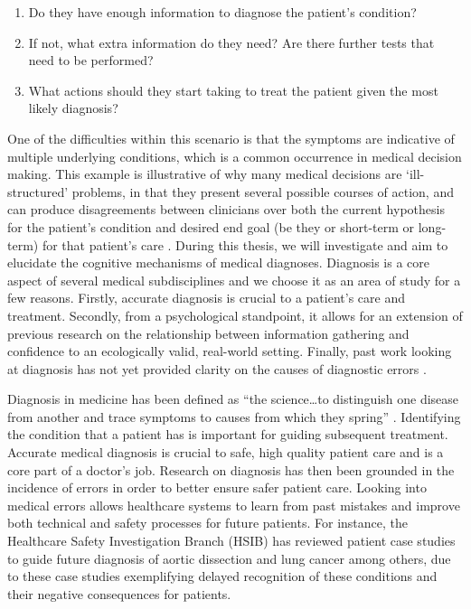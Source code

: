 \documentclass[a4paper, nobind]{templates/ociamthesis}
\providecommand{\tightlist}{%
  \setlength{\itemsep}{0pt}\setlength{\parskip}{0pt}}
\begin{document}
\begin{enumerate}
\def\labelenumi{\arabic{enumi}.}
\tightlist
\item
  Do they have enough information to diagnose the patient's condition?
\item
  If not, what extra information do they need? Are there further tests that need to be performed?
\item
  What actions should they start taking to treat the patient given the most likely diagnosis?
\end{enumerate}

One of the difficulties within this scenario is that the symptoms are indicative of multiple underlying conditions, which is a common occurrence in medical decision making. This example is illustrative of why many medical decisions are `ill-structured' problems, in that they present several possible courses of action, and can produce disagreements between clinicians over both the current hypothesis for the patient's condition and desired end goal (be they or short-term or long-term) for that patient's care \autocite{jonassen_instructional_1997}. During this thesis, we will investigate and aim to elucidate the cognitive mechanisms of medical diagnoses. Diagnosis is a core aspect of several medical subdisciplines and we choose it as an area of study for a few reasons. Firstly, accurate diagnosis is crucial to a patient's care and treatment. Secondly, from a psychological standpoint, it allows for an extension of previous research on the relationship between information gathering and confidence to an ecologically valid, real-world setting. Finally, past work looking at diagnosis has not yet provided clarity on the causes of diagnostic errors \autocite{van_den_berge_cognitive_2013,norman_etiology_2014,restrepo_annals_2020}.

\hfill\break
Diagnosis in medicine has been defined as ``the science\ldots to distinguish one disease from another and trace symptoms to causes from which they spring'' \autocite{fenwick_medical_1891}. Identifying the condition that a patient has is important for guiding subsequent treatment. Accurate medical diagnosis is crucial to safe, high quality patient care and is a core part of a doctor's job. Research on diagnosis has then been grounded in the incidence of errors in order to better ensure safer patient care. Looking into medical errors allows healthcare systems to learn from past mistakes and improve both technical and safety processes for future patients. For instance, the Healthcare Safety Investigation Branch (HSIB) has reviewed patient case studies to guide future diagnosis of aortic dissection \autocite{hsib_investigation_2021} and lung cancer \autocite{hsib_investigation_2022} among others, due to these case studies exemplifying delayed recognition of these conditions and their negative consequences for patients.
\end{document}
